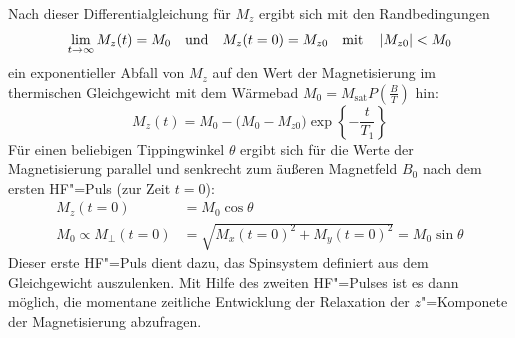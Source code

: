 Nach dieser Differentialgleichung für $M_z$ ergibt sich mit den Randbedingungen
	\begin{equation}
		\lim_{t\rightarrow\infty}M_z(t)=M_0 \ttextt{und} M_z(t=0)=M_{z0} \ttextt{mit}\abs{M_{z0}}<M_0
	\end{equation}
ein exponentieller Abfall von $M_z$ auf den Wert der Magnetisierung im thermischen Gleichgewicht
mit dem Wärmebad $M_0=M_\mathrm{sat}P\left(\frac{B}{T}\right)$ hin:
	\begin{equation}
		\label{eqn:mzdecay}
		M_z(t) = M_0 - \bigl(M_0-M_{z0}\bigr)\exp\left\{-\frac{t}{T_1}\right\}
	\end{equation}
Für einen beliebigen Tippingwinkel $\theta$ ergibt sich für die Werte der Magnetisierung parallel
und senkrecht zum äußeren Magnetfeld $B_0$ nach dem ersten HF"=Puls (zur Zeit $t=0$):
	\begin{align}
		M_z(t=0) &= M_0\cos\theta\\
		M_0 \propto M_\perp(t=0) &= \sqrt{\left.M_x(t=0)\right.^2+\left.M_y(t=0)\right.^2} = M_0\sin\theta\label{eqn:t1_m0}
	\end{align}
Dieser erste HF"=Puls dient dazu, das Spinsystem definiert aus dem Gleichgewicht auszulenken. Mit Hilfe
des zweiten HF"=Pulses ist es dann möglich, die momentane zeitliche Entwicklung der Relaxation der
$z$"=Komponete der Magnetisierung abzufragen.

